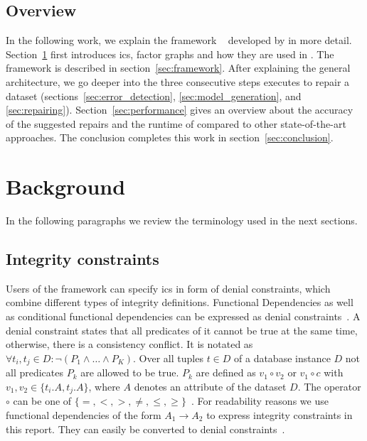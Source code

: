   \subsection{Overview}
  In the following work, we explain the framework \holoclean{}~\cite{holoclean} developed by \citeauthor{holoclean} in more detail.
  Section~\ref{sec:background} first introduces \glspl{ic}, factor graphs and how they are used in \deepdive{}.
  The \holoclean{} framework is described in section~\ref{sec:framework}.
  After explaining the general architecture, we go deeper into the three consecutive steps \holoclean{} executes to repair a dataset (sections~\ref{sec:error_detection}, \ref{sec:model_generation}, and \ref{sec:repairing}).
  Section~\ref{sec:performance} gives an overview about the accuracy of the suggested repairs and the runtime of \holoclean{} compared to other state-of-the-art approaches.
  The conclusion completes this work in section~\ref{sec:conclusion}.


\section{Background}\label{sec:background}
  In the following paragraphs we review the terminology used in the next sections.
  
  \subsection{Integrity constraints}
  Users of the \holoclean{} framework can specify \glspl{ic} in form of denial constraints, which combine different types of integrity definitions.
  Functional Dependencies as well as conditional functional dependencies can be expressed as denial constraints~\cite{fd_to_dc}.
  A denial constraint states that all predicates of it cannot be true at the same time, otherwise, there is a consistency conflict.
  It is notated as $\forall t_i, t_j \in D: \neg(P_1 \wedge \dots \wedge P_K)$.
  Over all tuples $t \in D$ of a database instance $D$ not all predicates $P_k$ are allowed to be true.
  $P_k$ are defined as $v_1 \circ v_2$ or $v_1 \circ c$ with $v_1, v_2 \in \{t_i.A, t_j.A\}$, where $A$ denotes an attribute of the dataset $D$.
  The operator $\circ$ can be one of $\{=,<,>,\neq,\leq,\geq\}$~\cite{chu2013discoveringdc}.
  For readability reasons we use functional dependencies of the form $A_1 \to A_2$ to express integrity constraints in this report.
  They can easily be converted to denial constraints~\cite{fd_to_dc}.
  
